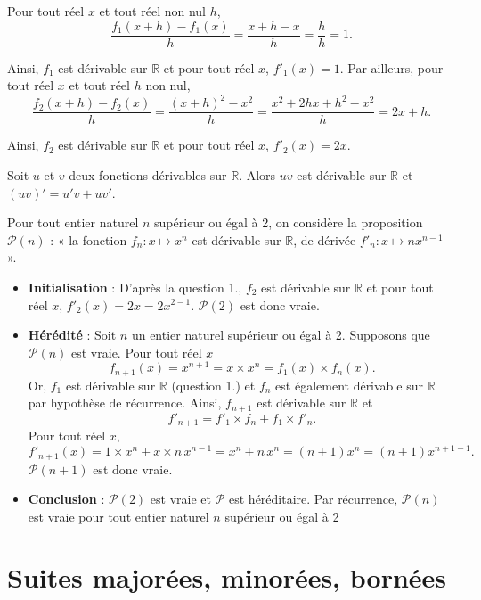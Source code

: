 \documentclass[11pt,fleqn]{book} %
\begin{document}
\begin{solution} Pour tout réel \(x\) et tout réel non nul \(h\),
\[ \dfrac{f_1(x+h) - f_1(x)}{h}=\dfrac{x+h-x}{h} = \dfrac{h}{h}=1.\]

Ainsi, \(f_1\) est dérivable sur \(\mathbb{R}\) et pour tout réel \(x\), \(f'_1(x)=1\). Par ailleurs, pour tout réel \(x\) et tout réel \(h\) non nul,
\[\dfrac{f_2(x+h)-f_2(x)}{h}=\dfrac{(x+h)^2-x^2}{h}=\dfrac{x^2+2hx+h^2-x^2}{h}=2x+h.\]

Ainsi, \(f_2\) est dérivable sur \(\mathbb{R}\) et pour tout réel \(x\), \(f'_2(x)=2x\).

Soit \(u\) et \(v\) deux fonctions dérivables sur \(\mathbb{R}\). Alors \(uv\) est dérivable sur \(\mathbb{R}\) et \((uv)'=u'v+uv'\).

Pour tout entier naturel \(n\) supérieur ou égal à 2, on considère la proposition \( \mathcal{P}(n)\) : « la fonction \(f_n : x \mapsto x^n\) est dérivable sur \(\mathbb{R}\), de dérivée \(f'_n : x \mapsto nx^{n-1}\) ».
\begin{itemize} \item \textbf{Initialisation} : D'après la question 1., \(f_2\) est dérivable sur \(\mathbb{R}\) et pour tout réel \(x\), \(f'_2(x)=2x=2x^{2-1}\). \(\mathcal{P}(2)\) est donc vraie.
\item \textbf{Hérédité} : Soit \(n\) un entier naturel supérieur ou égal à 2. Supposons que \( \mathcal{P}(n)\) est vraie. Pour tout réel \(x\)\[ f_{n+1}(x) = x^{n+1} = x \times x^n = f_1(x) \times f_n(x) .\]
Or, \(f_1\) est dérivable sur \(\mathbb{R}\) (question 1.) et \(f_n\) est également dérivable sur \(\mathbb{R}\) par hypothèse de récurrence. Ainsi, \(f_{n+1}\) est dérivable sur \(\mathbb{R}\) et
\[f'_{n+1}=f'_1 \times f_n + f_1 \times f'_n.\]
Pour tout réel \(x\),
\[ f'_{n+1}(x)= 1 \times x^n + x \times n\,x^{n-1} = x^n+n\,x^n=(n+1)x^n=(n+1) x^{n+1-1}.\]
\(\mathcal{P}(n+1)\) est donc vraie.
\item \textbf{Conclusion} : \(\mathcal{P}(2)\) est vraie et \(\mathcal{P}\) est héréditaire. Par récurrence, \(\mathcal{P}(n)\) est vraie pour tout entier naturel \(n\) supérieur ou égal à 2\end{itemize}\end{solution}



\section*{Suites majorées, minorées, bornées}
\end{document}
